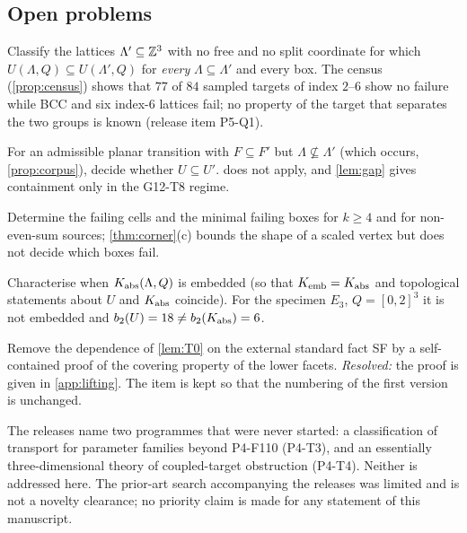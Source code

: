 \subsection{Open problems}
\begin{problem}\label{prob:Q1}
Classify the lattices $\Lambda'\subseteq\mathbb Z^3$ with no free and no split coordinate for which $U(\Lambda,Q)\subseteq U(\Lambda',Q)$ for \emph{every} $\Lambda\subseteq\Lambda'$ and every box. The census (\cref{prop:census}) shows that $77$ of $84$ sampled targets of index $2$--$6$ show no failure while BCC and six index-$6$ lattices fail; no property of the target that separates the two groups is known (release item P5-Q1).
\end{problem}
\begin{problem}\label{prob:incomp}
For an admissible planar transition with $F\subseteq F'$ but $\Lambda\not\subseteq\Lambda'$ (which occurs, \cref{prop:corpus}), decide whether $U\subseteq U'$.  does not apply, and \cref{lem:gap} gives containment only in the G12-T8 regime.
\end{problem}
\begin{problem}\label{prob:hd}
Determine the failing cells and the minimal failing boxes for $k\ge4$ and for non-even-sum sources; \cref{thm:corner}(c) bounds the shape of a scaled vertex but does not decide which boxes fail.
\end{problem}
\begin{problem}[embeddedness]\label{prob:emb}
Characterise when $K_{\mathrm{abs}}(\Lambda,Q)$ is embedded (so that $K_{\mathrm{emb}}=K_{\mathrm{abs}}$ and topological statements about $U$ and $K_{\mathrm{abs}}$ coincide). For the specimen $E_3$, $Q=[0,2]^3$ it is not embedded and $b_2(U)=18\ne b_2(K_{\mathrm{abs}})=6$.
\end{problem}
\begin{problem}\label{prob:SF}
Remove the dependence of \cref{lem:T0} on the external standard fact SF by a self-contained proof of the covering property of the lower facets. \emph{Resolved:} the proof is given in \cref{app:lifting}. The item is kept so that the numbering of the first version is unchanged.
\end{problem}
\begin{problem}\label{prob:T3T4}
The releases name two programmes that were never started: a classification of transport for parameter families beyond P4-F110 (P4-T3), and an essentially three-dimensional theory of coupled-target obstruction (P4-T4). Neither is addressed here. The prior-art search accompanying the releases was limited and is not a novelty clearance; no priority claim is made for any statement of this manuscript.
\end{problem}
